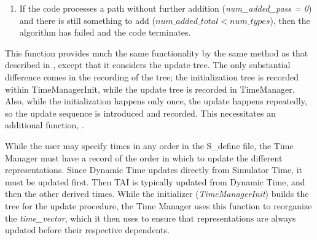 {\begin{enumerate}
{\begin{enumerate}
{\begin{enumerate}
{\begin{enumerate}
\item For each time-type that is not yet in the tree:

\begin{itemize}
\item If it has a defined time-type from which to initialize, add it to
the tree (recursively adding its parent as necessary).
\item If it does not have a defined time-type from which to initialize,
test it using status \textit{seeking\_status} 
to determine whether an appropriate converter
function exists.  If it does, add the type to the tree with status
\textit{seeking\_status+1}.  If not, wait for the next pass.
\end{itemize}

\item The total number of types in the tree (\textit{num\_added\_total})
is incremented by
\textit{num\_added\_pass}, and the code loops back to step A.

\end{enumerate}}

\item If the code processes a path without further addition
(\textit{num\_added\_pass = 0}) and there is still something to add
($num\_added\_total < num\_types$), then the algorithm has failed and
the code terminates.
\end{enumerate}}

\label{ref:createupdatetree}This function provides much the same
functionality by the same method as that described in
, 
except that it considers the update tree. 
The only substantial difference comes in the recording of the tree; the
initialization tree is recorded within TimeManagerInit, while the
update tree is recorded in TimeManager.  Also, while the initialization
happens only once, the update happens repeatedly, so the update sequence
is introduced and recorded.  This necessitates an additional function,
.

\label{ref:setorderedupdatelist} While the user may specify times in any 
order in the S\_define file, the Time Manager must have a record of the
order in which to update the different representations.  Since Dynamic
Time updates directly from Simulator Time, it must be updated first. 
Then TAI is typically updated from Dynamic Time, and then the other
derived times.  While the initializer (\textit{TimeManagerInit}) builds the 
tree
for the update procedure, the Time Manager uses this function to reorganize 
the \textit{time\_vector}, which it then uses to ensure that
representations are always updated before their respective dependents. 


\end{enumerate}}
\end{enumerate}}
